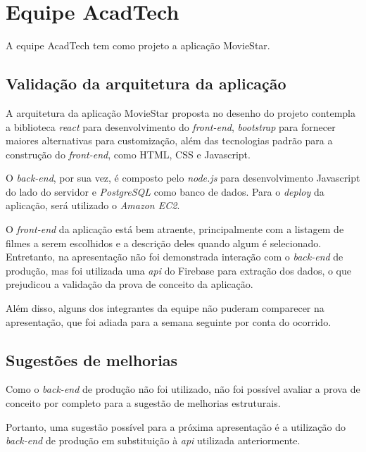 \chapter{Equipe AcadTech}

A equipe AcadTech tem como projeto a aplicação MovieStar.

\section{Validação da arquitetura da aplicação}
A arquitetura da aplicação MovieStar proposta no desenho do projeto contempla a biblioteca \textit{\gls{react}} para desenvolvimento do \textit{\gls{front-end}}, \textit{\gls{bootstrap}} para fornecer maiores alternativas para customização, além das tecnologias padrão para a construção do \textit{\gls{front-end}}, como HTML, CSS e Javascript.


O \textit{\gls{back-end}}, por sua vez, é composto pelo \textit{\gls{node.js}} para desenvolvimento Javascript do lado do servidor e \textit{PostgreSQL} como banco de dados. Para o \textit{\gls{deploy}} da aplicação, será utilizado o \textit{Amazon EC2}.


O \textit{\gls{front-end}} da aplicação está bem atraente, principalmente com a listagem de filmes a serem escolhidos e a descrição deles quando algum é selecionado. Entretanto, na apresentação não foi demonstrada interação com o \textit{\gls{back-end}} de produção, mas foi utilizada uma \textit{\ac{api}} do Firebase para extração dos dados, o que prejudicou a validação da prova de conceito da aplicação.


Além disso, alguns dos integrantes da equipe não puderam comparecer na apresentação, que foi adiada para a semana seguinte por conta do ocorrido.

\section{Sugestões de melhorias}
Como o \textit{\gls{back-end}} de produção não foi utilizado, não foi possível avaliar a prova de conceito por completo para a sugestão de melhorias estruturais.


Portanto, uma sugestão possível para a próxima apresentação é a utilização do \textit{\gls{back-end}} de produção em substituição à \textit{\ac{api}} utilizada anteriormente.